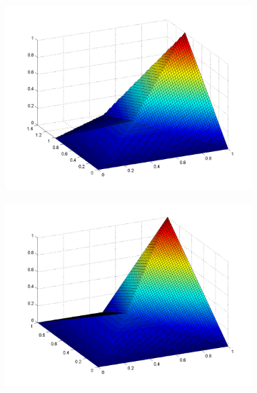 \begin{figure}
\label{fig::2D_PWL_pentagon_basis_functions_plot}
\centering
	\begin{subfigure}[b]{0.48\textwidth}
		\centering
		\includegraphics[width=\textwidth]{figures/sec_BF/PWL_rpent_plot_A.png}
		\caption{}
	\end{subfigure}
	\hfill
	\begin{subfigure}[b]{0.48\textwidth}
		\centering
		\includegraphics[width=\textwidth]{figures/sec_BF/PWL_dpent_plot_A.png}
		\caption{}
	\end{subfigure}
	\vfill
	\begin{subfigure}[b]{0.48\textwidth}
		\centering

\end{subfigure}
\end{figure}
